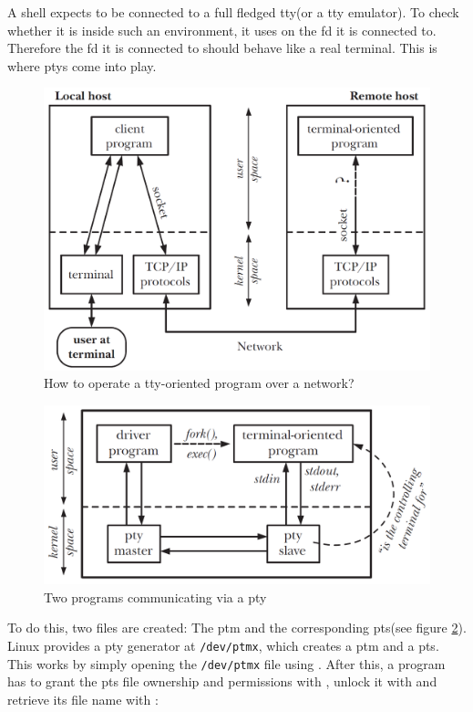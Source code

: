 \documentclass[10pt,a4paper,titlepage,twoside,english,final]{zhawreprt}
\begin{document}
A \gls{shell} expects to be connected to a full fledged \gls{tty}(or a \gls{tty} emulator).
To check whether it is inside such an environment, it uses \cite{isatty} on the \gls{fd} it is connected to.
Therefore the \gls{fd} it is connected to should behave like a real \gls{terminal}.
This is where \glspl{pty} come into play.

\begin{figure}[ht]
\includegraphics[width=\textwidth]{PseudoterminalProblem}
\caption{How to operate a \gls{tty}-oriented program over a network? \citep[p.1376]{KerriskTLPI}}
\label{fig:HowToOperateTtyOrientedProgramOverNetwork}
\end{figure}

\begin{figure}[ht]
\includegraphics[width=\textwidth]{Pseudoterminal}
\caption{Two programs communicating via a \gls{pty} \citep[p.1377]{KerriskTLPI}}
\label{fig:TwoProgramsCommunicatingViaAPty}
\end{figure}

To do this, two files are created:
The \gls{ptm} and the corresponding \gls{pts}(see figure \ref{fig:TwoProgramsCommunicatingViaAPty}).
\gls{Linux} provides a \gls{pty} generator at \texttt{/dev/ptmx}, which creates a \gls{ptm} and a \gls{pts}.
This works by simply opening the \texttt{/dev/ptmx} file using \cite{posix_openpt}.
After this, a program has to grant the \gls{pts} file ownership and permissions with \cite{grantpt}, unlock it with \cite{unlockpt} and retrieve its file name with \cite{ptsname}:
\end{document}
